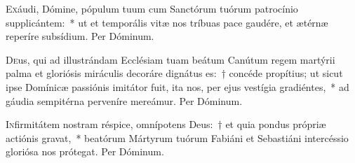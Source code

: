\documentclass[vesperale_romanum.tex]{subfiles}
\begin{document}

\myrule
{}

\simplex


\oratio

\lettrine{E}{x}áudi, Dómine, pópulum tuum cum Sanctórum tuórum patrocínio supplicántem:~* ut et temporális vitæ nos tríbuas pace gaudére, et ætérnæ reperíre subsídium.
Per Dóminum.


\oratio

\lettrine{D}{e}us, qui ad illustrándam Ecclésiam tuam beátum Canútum regem martýrii palma et gloriósis miráculis decoráre dignátus es:~† concéde propítius; ut  sicut ipse Domínicæ passiónis imitátor fuit, ita nos, per ejus vestígia gradiéntes,~* ad gáudia sempitérna perveníre mereámur.
Per Dóminum.

\vespsequenti

\myrule
{}

\duplexmajus

\oratio

\lettrine{I}{n}firmitátem nostram réspice, omnípotens Deus:~† et quia pondus própriæ actiónis gravat,~* beatórum Mártyrum tuórum Fabiáni et Sebastiáni intercéssio gloriósa nos prótegat.
Per Dóminum.

\capitdeseq

\myrule



\duplex

\end{document}
